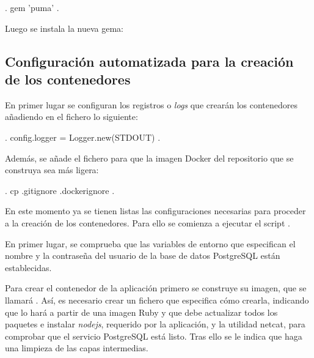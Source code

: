 \begin{codelisting}
\label{code:addpuma}
\begin{code}
.
gem 'puma'
.
\end{code}
\end{codelisting}

Luego se instala la nueva gema: 


\subsection{Configuración automatizada para la creación de los contenedores}

En primer lugar se configuran los registros o \textit{logs} que crearán los contenedores añadiendo en el fichero  lo siguiente:

\begin{codelisting}
\label{code:application.rb}
\begin{code}
.
config.logger = Logger.new(STDOUT)
.
\end{code}
\end{codelisting}

Además, se añade el fichero  para que la imagen Docker del repositorio que se construya sea más ligera:

\begin{codelisting}
\label{code:.dockerignore}
\begin{code}
.
cp .gitignore .dockerignore
.
\end{code}
\end{codelisting}

En este momento ya se tienen listas las configuraciones necesarias para proceder a la creación de los contenedores. Para ello se comienza a ejecutar el script .

En primer lugar, se comprueba que las variables de entorno que especifican el nombre y la contraseña del usuario de la base de datos PostgreSQL están establecidas.

Para crear el contenedor de la aplicación primero se construye su imagen, que se llamará . Así, es necesario crear un fichero  que especifica cómo crearla, indicando que lo hará a partir de una imagen Ruby y que debe actualizar todos los paquetes e instalar \textit{nodejs}, requerido por la aplicación, y la utilidad netcat, para comprobar que el servicio PostgreSQL está listo. Tras ello se le indica que haga una limpieza de las capas intermedias. 

